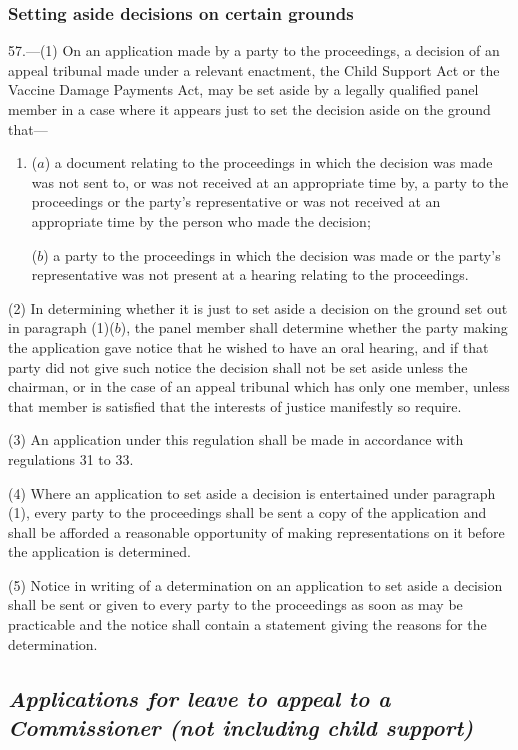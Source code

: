 \documentclass[12pt,a4paper]{article}
\begin{document}
\subsubsection[57. Setting aside decisions on certain grounds]{Setting aside decisions on certain grounds}

57.—(1) On an application made by a party to the proceedings, a decision of an appeal tribunal made under a relevant enactment, the Child Support Act or the Vaccine Damage Payments Act, may be set aside by a legally qualified panel member in a case where it appears just to set the decision aside on the ground that—
\begin{enumerate}\item[]
($a$) a document relating to the proceedings in which the decision was made was not sent to, or was not received at an appropriate time by, a party to the proceedings or the party’s representative or was not received at an appropriate time by the person who made the decision;

($b$) a party to the proceedings in which the decision was made or the party’s representative was not present at a hearing relating to the proceedings.
\end{enumerate}

(2) In determining whether it is just to set aside a decision on the ground set out in paragraph (1)($b$), the panel member shall determine whether the party making the application gave notice that he wished to have an oral hearing, and if that party did not give such notice the decision shall not be set aside unless the chairman, or in the case of an appeal tribunal which has only one member, unless that member is satisfied that the interests of justice manifestly so require.

(3) An application under this regulation shall be made in accordance with regulations 31 to 33.

(4) Where an application to set aside a decision is entertained under paragraph (1), every party to the proceedings shall be sent a copy of the application and shall be afforded a reasonable opportunity of making representations on it before the application is determined.

(5) Notice in writing of a determination on an application to set aside a decision shall be sent or given to every party to the proceedings as soon as may be practicable and the notice shall contain a statement giving the reasons for the determination.

\subsection{\itshape Applications for leave to appeal to a Commissioner (not including child support)}
\end{document}
